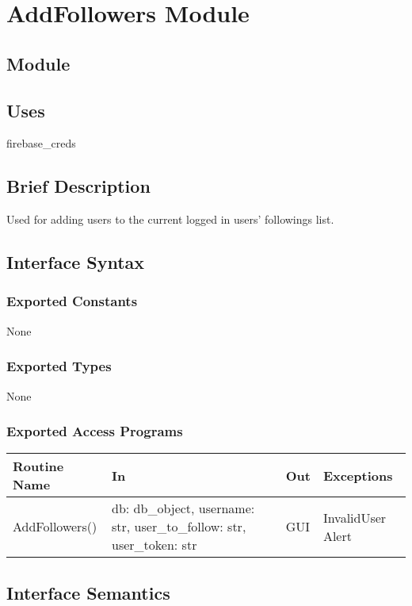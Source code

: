 \documentclass[12pt, titlepage]{article}
\begin{document}
\newpage
\section* {AddFollowers Module}

\subsection*{Module}

\subsection* {Uses}
firebase\_creds

\subsection* {Brief Description}
Used for adding users to the current logged in users' followings list.

\subsection* {Interface Syntax}
\subsubsection* {Exported Constants}
None

\subsubsection* {Exported Types}
None

\subsubsection* {Exported Access Programs}
\begin{table}[!htb]
    \centering
    \begin{tabular}{|p{3cm}|p{3cm}|p{3cm}|p{4.5cm}|}
        \hline
        \textbf{Routine Name} & \textbf{In} & \textbf{Out} & \textbf{Exceptions} \\
        \hline
         AddFollowers() & db: db\_object, username: str, user\_to\_follow: str, user\_token: str  & GUI & InvalidUser Alert\\
        \hline
    \end{tabular}
\end{table}

\subsection{Interface Semantics}
\end{document}
